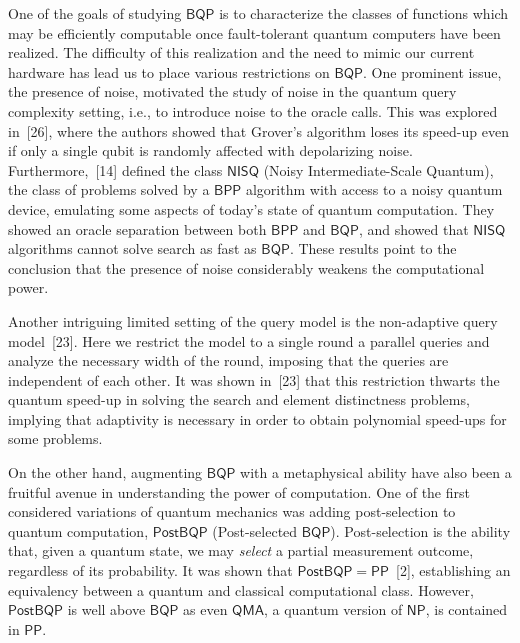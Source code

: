 \documentclass[10pt,a4paper]{article}
\begin{document}
One of the goals of studying $\mathsf{BQP}$ is to characterize the classes of functions which may be efficiently computable once fault-tolerant quantum computers have been realized. The difficulty of this realization and the need to mimic our current hardware has lead us to place various restrictions on $\mathsf{BQP}$. One prominent issue, the presence of noise, motivated the study of noise in the quantum query complexity setting, i.e., to introduce noise to the oracle calls. This was explored in [26], where the authors showed that Grover’s algorithm loses its speed-up even if only a single qubit is randomly affected with depolarizing noise. Furthermore, [14] defined the class $\mathsf{NISQ}$ (Noisy Intermediate-Scale Quantum), the class of problems solved by a $\mathsf{BPP}$ algorithm with access to a noisy quantum device, emulating some aspects of today’s state of quantum computation. They showed an oracle separation between both $\mathsf{BPP}$ and $\mathsf{BQP}$, and showed that $\mathsf{NISQ}$ algorithms cannot solve search as fast as $\mathsf{BQP}$.
These results point to the conclusion that the presence of noise considerably weakens the computational power.\par




Another intriguing limited setting of the query model is the non-adaptive query model [23]. Here we restrict the model to a single round a parallel queries and analyze the necessary width of the round, imposing that the queries are independent of each other. It was shown in [23] that this restriction thwarts the quantum speed-up in solving the search and element distinctness problems, implying that adaptivity is necessary in order to obtain polynomial speed-ups for some problems.\par




On the other hand, augmenting $\mathsf{BQP}$ with a metaphysical ability have also been a fruitful avenue in understanding the power of computation.
One of the first considered variations of quantum mechanics was adding post-selection to quantum computation, $\mathsf{PostBQP}$ (Post-selected $\mathsf{BQP}$). Post-selection is the ability that, given a quantum state, we may \emph{select} a partial measurement outcome, regardless of its probability. It was shown that $\mathsf{PostBQP}=\mathsf{PP}$ [2], establishing an equivalency between a quantum and classical computational class. However, $\mathsf{PostBQP}$ is well above $\mathsf{BQP}$ as even $\mathsf{QMA}$, a quantum version of $\mathsf{NP}$, is contained in $\mathsf{PP}$.\par
\end{document}
